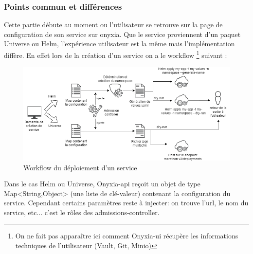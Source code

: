\documentclass[11pt,fleqn]{book} %
\begin{document}
\subsubsection{Points commun et différences}
Cette partie débute au moment ou l'utilisateur se retrouve sur la page de configuration de son service sur onyxia. Que le service proviennent d'un paquet Universe ou Helm, l'expérience utilisateur est la même mais l'implémentation diffère. En effet lors de la création d'un service on a le workflow \footnote{On ne fait pas apparaître ici comment Onyxia-ui récupère les informations techniques de l'utilisateur (Vault, Git, Minio)} suivant : 
\begin{figure}[H]\centering
\includegraphics[scale=0.6]{Pictures/onyxia/publish-service.png}
\captionsetup{margin=1.5cm,format=hang,justification=justified}
\caption{Workflow du déploiement d'un service \newline}
\end{figure}
Dans le cas Helm ou Universe, Onyxia-api reçoit un objet de type Map<String,Object> (une liste de clé-valeur) contenant la configuration du service. Cependant certains paramètres reste à injecter: on trouve l'url, le nom du service, etc... c'est le rôles des admissions-controller.\\
\end{document}
